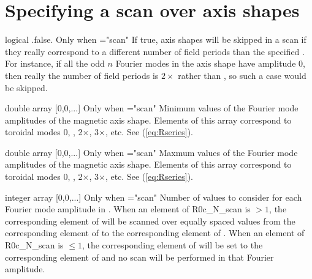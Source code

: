 \myhrule


\section{Specifying a scan over axis shapes}

{logical}
{{\ttfamily .false.}}
{Only when ={\ttfamily "scan"}}
{If true, axis shapes will be skipped in a scan if they really correspond to a different number of field periods than the specified . For instance, if all the odd $n$ Fourier modes in the axis shape have amplitude 0, then really the number of field periods is $2\times$  rather than , so such a case would be skipped.}

\myhrule

{double array}
{[0,0,...]}
{Only when ={\ttfamily "scan"}}
{Minimum values of the Fourier mode amplitudes of the magnetic axis shape. Elements of this array correspond to toroidal modes 0, , 2$\times$, 3$\times$, etc.  See (\ref{eq:Rseries}).
}

\myhrule

{double array}
{[0,0,...]}
{Only when ={\ttfamily "scan"}}
{Maxmum values of the Fourier mode amplitudes of the magnetic axis shape. Elements of this array correspond to toroidal modes 0, , 2$\times$, 3$\times$, etc.  See (\ref{eq:Rseries}).
}

\myhrule

{integer array}
{[0,0,...]}
{Only when ={\ttfamily "scan"}}
{Number of values to consider for each Fourier mode amplitude in . When an element of {\ttfamily R0c\_N\_scan} is $>1$, the corresponding element of  will be scanned over equally spaced values from the corresponding element of  to the corresponding element of .  When an element of {\ttfamily R0c\_N\_scan} is $\le 1$, the corresponding element of  will be set to the corresponding element of  and no scan will be performed in that Fourier amplitude.
}

\myhrule


